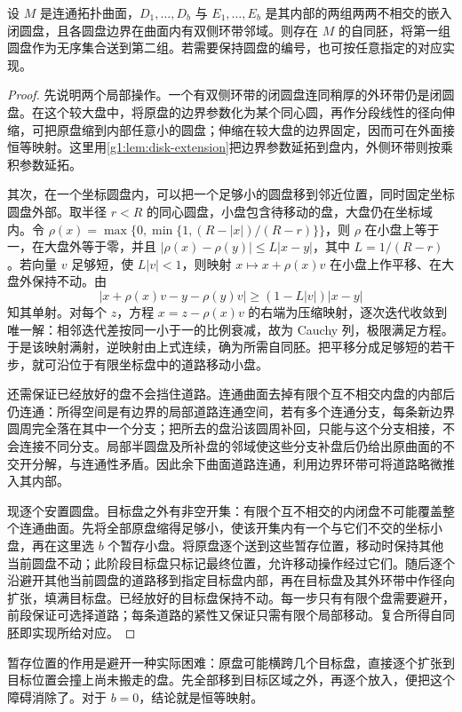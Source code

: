 \begin{lemma}\label{g1:lem:disk-configuration}
	设 \(M\) 是连通拓扑曲面，\(D_1,\ldots,D_b\) 与 \(E_1,\ldots,E_b\) 是其内部的两组两两不相交的嵌入闭圆盘，且各圆盘边界在曲面内有双侧环带邻域。则存在 \(M\) 的自同胚，将第一组圆盘作为无序集合送到第二组。若需要保持圆盘的编号，也可按任意指定的对应实现。
\end{lemma}
\begin{proof}
	先说明两个局部操作。一个有双侧环带的闭圆盘连同稍厚的外环带仍是闭圆盘。在这个较大盘中，将原盘的边界参数化为某个同心圆，再作分段线性的径向伸缩，可把原盘缩到内部任意小的圆盘；伸缩在较大盘的边界固定，因而可在外面接恒等映射。这里用\cref{g1:lem:disk-extension}把边界参数延拓到盘内，外侧环带则按乘积参数延拓。

	其次，在一个坐标圆盘内，可以把一个足够小的圆盘移到邻近位置，同时固定坐标圆盘外部。取半径 \(r<R\) 的同心圆盘，小盘包含待移动的盘，大盘仍在坐标域内。令 \(\rho(x)=\max\{0,\min\{1,(R-|x|)/(R-r)\}\}\)，则 \(\rho\) 在小盘上等于一，在大盘外等于零，并且 \(|\rho(x)-\rho(y)|\le L|x-y|\)，其中 \(L=1/(R-r)\)。若向量 \(v\) 足够短，使 \(L|v|<1\)，则映射 \(x\mapsto x+\rho(x)v\) 在小盘上作平移、在大盘外保持不动。由
	\[
		|x+\rho(x)v-y-\rho(y)v|\ge(1-L|v|)|x-y|
	\]
	知其单射。对每个 \(z\)，方程 \(x=z-\rho(x)v\) 的右端为压缩映射，逐次迭代收敛到唯一解：相邻迭代差按同一小于一的比例衰减，故为 Cauchy 列，极限满足方程。于是该映射满射，逆映射由上式连续，确为所需自同胚。把平移分成足够短的若干步，就可沿位于有限坐标盘中的道路移动小盘。

	还需保证已经放好的盘不会挡住道路。连通曲面去掉有限个互不相交内盘的内部后仍连通：所得空间是有边界的局部道路连通空间，若有多个连通分支，每条新边界圆周完全落在其中一个分支；把所去的盘沿该圆周补回，只能与这个分支相接，不会连接不同分支。局部半圆盘及所补盘的邻域使这些分支补盘后仍给出原曲面的不交开分解，与连通性矛盾。因此余下曲面道路连通，利用边界环带可将道路略微推入其内部。

	现逐个安置圆盘。目标盘之外有非空开集：有限个互不相交的内闭盘不可能覆盖整个连通曲面。先将全部原盘缩得足够小，使该开集内有一个与它们不交的坐标小盘，再在这里选 \(b\) 个暂存小盘。将原盘逐个送到这些暂存位置，移动时保持其他当前圆盘不动；此阶段目标盘只标记最终位置，允许移动操作经过它们。随后逐个沿避开其他当前圆盘的道路移到指定目标盘内部，再在目标盘及其外环带中作径向扩张，填满目标盘。已经放好的目标盘保持不动。每一步只有有限个盘需要避开，前段保证可选择道路；每条道路的紧性又保证只需有限个局部移动。复合所得自同胚即实现所给对应。
\end{proof}

暂存位置的作用是避开一种实际困难：原盘可能横跨几个目标盘，直接逐个扩张到目标位置会撞上尚未搬走的盘。先全部移到目标区域之外，再逐个放入，便把这个障碍消除了。对于 \(b=0\)，结论就是恒等映射。


